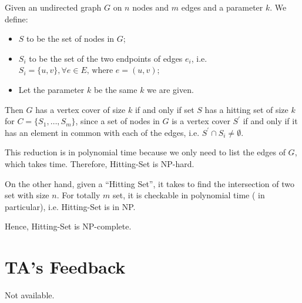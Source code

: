 \documentclass[12pt,letterpaper,titlepage,en-US]{article}
\begin{document}
\begin{homeworkProblem}[NP-completeness]
\begin{homeworkSubProblem}
Given an undirected graph $G$ on $n$ nodes and $m$ edges and a parameter $k$.
We define:
\begin{itemize}
    \item $S$ to be the set of nodes in $G$;
    \item $S_i$ to be the set of the
        two endpoints of edges $e_i$, i.e. $S_i = \{u,v\}, \forall e \in E \text{, where } e = (u,v)$;
    \item Let the parameter $k$ be the same $k$ we are given.
\end{itemize}
Then $G$ has a vertex cover of size $k$ if and only if set $S$ has a hitting set
of size $k$ for $C = \{S_1, \ldots , S_m\}$, since a set of nodes in $G$ is a vertex cover $S^\prime$
if and only if it has an element in common with each of the edges,
i.e. $S^\prime \cap S_i \neq \emptyset$.

This reduction is in polynomial time because we only need to list the edges
of $G$, which takes  time.
Therefore, Hitting-Set is NP-hard.

On the other hand, given a ``Hitting Set'', it takes  to find
the intersection of two set with size $n$. For totally $m$ set, it is checkable in polynomial
time ( in particular), i.e. Hitting-Set is in NP.

Hence, Hitting-Set is NP-complete.\hfill\qedsymbol
\end{homeworkSubProblem}

\end{homeworkProblem}

\section*{TA's Feedback}
Not available.
\end{document}
